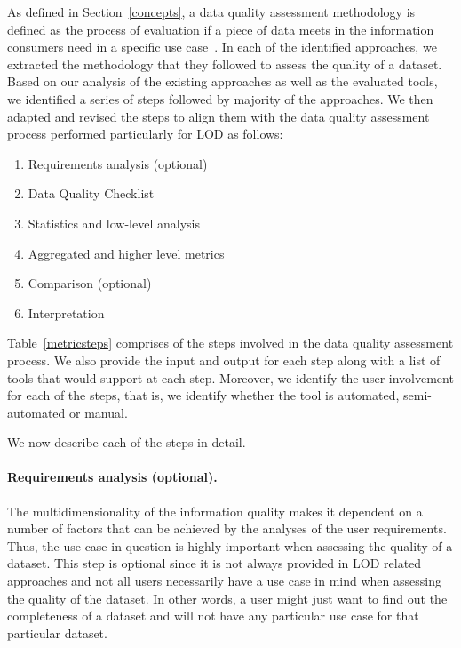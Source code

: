 As defined in Section~\ref{concepts}, a data quality assessment methodology is defined as the process of evaluation if a piece of data meets in the information consumers need in a specific use case~\cite{Bizer}.
In each of the identified approaches, we extracted the methodology that they followed to assess the quality of a dataset. 
Based on our analysis of the existing approaches as well as the evaluated tools, we identified a series of steps followed by majority of the approaches. 
We then adapted and revised the steps to align them with the data quality assessment process performed particularly for LOD as follows: 
\begin{enumerate}
\item Requirements analysis (optional)
\item Data Quality Checklist
\item Statistics and low-level analysis
\item Aggregated and higher level metrics
\item Comparison (optional)
\item Interpretation
\end{enumerate}

Table~\ref{metricsteps} comprises of the steps involved in the data quality assessment process. 
We also provide the input and output for each step along with a list of tools that would support at each step. 
Moreover, we identify the user involvement for each of the steps, that is, we identify whether the tool is automated, semi-automated or manual.

We now describe each of the steps in detail. 
\paragraph{\textbf{Requirements analysis (optional).}}
The multidimensionality of the information quality makes it dependent on a number of factors that can be achieved by the analyses of the user requirements. 
Thus, the use case in question is highly important when assessing the quality of a dataset.
This step is optional since it is not always provided in LOD related approaches and not all users necessarily have a use case in mind when assessing the quality of the dataset.
In other words, a user might just want to find out the completeness of a dataset and will not have any particular use case for that particular dataset.

